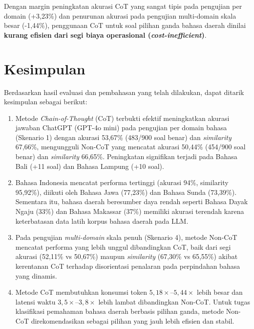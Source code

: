\documentclass[10pt,a4paper]{article}
\begin{document}
Dengan margin peningkatan akurasi CoT yang sangat tipis pada pengujian per domain (+3,23\%) dan penurunan akurasi pada pengujian multi-domain skala besar (-1,44\%), penggunaan CoT untuk soal pilihan ganda bahasa daerah dinilai \textbf{kurang efisien dari segi biaya operasional (\textit{cost-inefficient})}.

\section{Kesimpulan}

Berdasarkan hasil evaluasi dan pembahasan yang telah dilakukan, dapat ditarik kesimpulan sebagai berikut:
\begin{enumerate}\setlength{\itemsep}{0pt}\setlength{\parskip}{0pt}
    \item Metode \textit{Chain-of-Thought} (CoT) terbukti efektif meningkatkan akurasi jawaban ChatGPT (GPT-4o mini) pada pengujian per domain bahasa (Skenario 1) dengan akurasi 53,67\% (483/900 soal benar) dan \textit{similarity} 67,66\%, mengungguli Non-CoT yang mencatat akurasi 50,44\% (454/900 soal benar) dan \textit{similarity} 66,65\%. Peningkatan signifikan terjadi pada Bahasa Bali (+11 soal) dan Bahasa Lampung (+10 soal).
    \item Bahasa Indonesia mencatat performa tertinggi (akurasi 94\%, similarity 95,92\%), diikuti oleh Bahasa Jawa (77,23\%) dan Bahasa Sunda (73,39\%). Sementara itu, bahasa daerah beresumber daya rendah seperti Bahasa Dayak Ngaju (33\%) dan Bahasa Makassar (37\%) memiliki akurasi terendah karena keterbatasan data latih korpus bahasa daerah pada LLM.
    \item Pada pengujian \textit{multi-domain} skala penuh (Skenario 4), metode Non-CoT mencatat performa yang lebih unggul dibandingkan CoT, baik dari segi akurasi (52,11\% vs 50,67\%) maupun \textit{similarity} (67,30\% vs 65,55\%) akibat kerentanan CoT terhadap disorientasi penalaran pada perpindahan bahasa yang dinamis.
    \item Metode CoT membutuhkan konsumsi token $5{,}18\times$--$5{,}44\times$ lebih besar dan latensi waktu $3{,}5\times$--$3{,}8\times$ lebih lambat dibandingkan Non-CoT. Untuk tugas klasifikasi pemahaman bahasa daerah berbasis pilihan ganda, metode Non-CoT direkomendasikan sebagai pilihan yang jauh lebih efisien dan stabil.
\end{enumerate}
\end{document}
